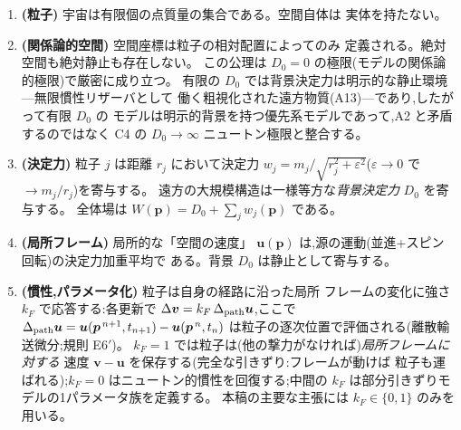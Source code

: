 \documentclass[a4paper,10pt,twocolumn]{ltjsarticle}
\newcommand{\vect}[1]{\bm{#1}}
\newcommand{\Dz}{D_0}
\begin{document}
\begin{enumerate}
\item[A1.]{\bf (粒子)} 宇宙は有限個の点質量の集合である。空間自体は
実体を持たない。

\item[A2.]{\bf (関係論的空間)} 空間座標は粒子の相対配置によってのみ
定義される。絶対空間も絶対静止も存在しない。
この公理は $\Dz = 0$ の極限(モデルの関係論的極限)で厳密に成り立つ。
有限の $\Dz$ では背景決定力は明示的な静止環境---無限慣性リザーバとして
働く粗視化された遠方物質(A13)---であり,したがって有限 $\Dz$ の
モデルは明示的背景を持つ優先系モデルであって,A2 と矛盾するのではなく
C4 の $\Dz \to \infty$ ニュートン極限と整合する。

\item[A3.]{\bf (決定力)} 粒子 $j$ は距離 $r_j$ において決定力
$w_j = m_j/\sqrt{r_j^2+\varepsilon^2}$($\varepsilon\to 0$ で
$\to m_j/r_j$)を寄与する。
遠方の大規模構造は一様等方な\emph{背景決定力} $\Dz$ を寄与する。
全体場は $W(\vect{p}) = \Dz + \sum_j w_j(\vect{p})$ である。

\item[A4.]{\bf (局所フレーム)} 局所的な「空間の速度」
$\vect{u}(\vect{p})$ は,源の運動(並進+スピン回転)の決定力加重平均で
ある。背景 $\Dz$ は静止として寄与する。

\item[A5.]{\bf (慣性,パラメータ化)} 粒子は自身の経路に沿った局所
フレームの変化に強さ $k_F$ で応答する:各更新で
$\Delta\vect{v} = k_F\,\Delta_{\rm path}\vect{u}$,ここで
$\Delta_{\rm path}\vect{u}
 = \vect{u}(\vect{p}^{\,n+1},t_{n+1}) - \vect{u}(\vect{p}^{\,n},t_n)$
は粒子の逐次位置で評価される(離散輸送微分;規則 E6$'$)。
$k_F = 1$ では粒子は(他の撃力がなければ)\emph{局所フレームに対する}
速度 $\vect{v}-\vect{u}$ を保存する(完全な引きずり:フレームが動けば
粒子も運ばれる);$k_F = 0$ はニュートン的慣性を回復する;中間の
$k_F$ は部分引きずりモデルの1パラメータ族を定義する。
本稿の主要な主張には $k_F \in \{0,1\}$ のみを用いる。


\end{enumerate}
\end{document}
